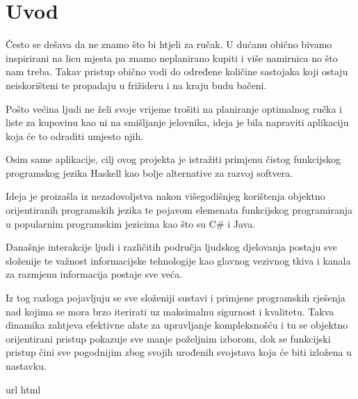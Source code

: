 \chapter{Uvod}

Često se dešava da ne znamo što bi htjeli za ručak. U dućanu obično bivamo inspirirani na licu mjesta pa znamo neplanirano kupiti i više namirnica no što nam treba. Takav pristup obično vodi do određene količine sastojaka koji ostaju neiskorišteni te propadaju u frižideru i na kraju budu bačeni.

Pošto većina ljudi ne želi svoje vrijeme trošiti na planiranje optimalnog ručka i liste za kupovinu kao ni na smišljanje jelovnika, ideja je bila napraviti aplikaciju koja će to odraditi umjesto njih.

Osim same aplikacije, cilj ovog projekta je istražiti primjenu čistog funkcijskog programskog jezika Haskell kao bolje alternative za razvoj softvera.

Ideja je proizašla iz nezadovoljstva nakon višegodišnjeg korištenja objektno orijentiranih programskih jezika te pojavom elemenata funkcijskog programiranja u popularnim programskim jezicima kao što su C\# i Java.

Današnje interakcije ljudi i različitih područja ljudskog djelovanja postaju sve složenije te važnost informacijske tehnologije kao glavnog vezivnog tkiva i kanala za razmjenu informacija postaje sve veća.

Iz tog razloga pojavljuju se sve složeniji sustavi i primjene programskih rješenja nad kojima se mora brzo iterirati uz maksimalnu sigurnost i kvalitetu. Takva dinamika zahtjeva efektivne alate za upravljanje kompleksnošću i tu se objektno orijentirani pristup pokazuje sve manje poželjnim izborom, dok se funkcijski pristup čini sve pogodnijim zbog svojih urođenih svojstava koja će biti izložena u nastavku.

\Ac{url}
\Ac{html}



